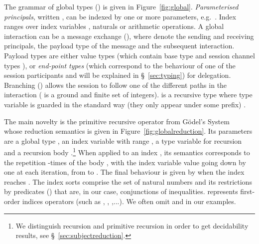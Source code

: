 \documentclass{LMCS}
\newcommand{\eg}{e.g.~}
\begin{document}
 

The grammar of global types () is given in Figure~\ref{fig:global}.
{\em Parameterised principals}, written , can be indexed by one or more parameters, \eg . Index
 ranges over index variables , naturals  or
arithmetic operations.  A global interaction can be a message exchange
(), where  denote the sending and receiving
principals,  the payload type of the message and  the subsequent
interaction.  Payload types  are either value types  (which contain
base type  and session channel types ), or 
{\em end-point types} 
(which correspond to the behaviour of one of the session participants and will
be explained in \S~\ref{sec:typing}) for
delegation. Branching () allows the session to follow one of the different 
paths in the interaction ( is a ground and finite set of integers). 
 is a recursive type where   
type variable  
is guarded in the standard way 
(they only appear under some prefix)
 \cite{PierceBC:typsysfpl}.

The main novelty is the primitive recursive operator
 from G\"odel's System
~\cite{GirardJY:protyp} 
whose reduction semantics is given in Figure~\ref{fig:globalreduction}.  
Its parameters are a global type , an index variable
 with range ,
 a type variable for recursion  and a recursion body
.\footnote{We distinguish recursion and primitive recursion in order to get
  decidability results, see \S~\ref{sec:subjectreduction}. } 
When applied to an index , its semantics corresponds to the
repetition -times of the body , with the index variable  value
going down by one at each iteration, from  to . The final
behaviour is 
given by  when the index reaches . 
The index sorts comprise the set of natural numbers and its restrictions by predicates () that are, in our case, conjunctions of inequalities.   represents first-order indices operators
(such as , , ,...). 
We often omit  and  in our examples. 
\end{document}
